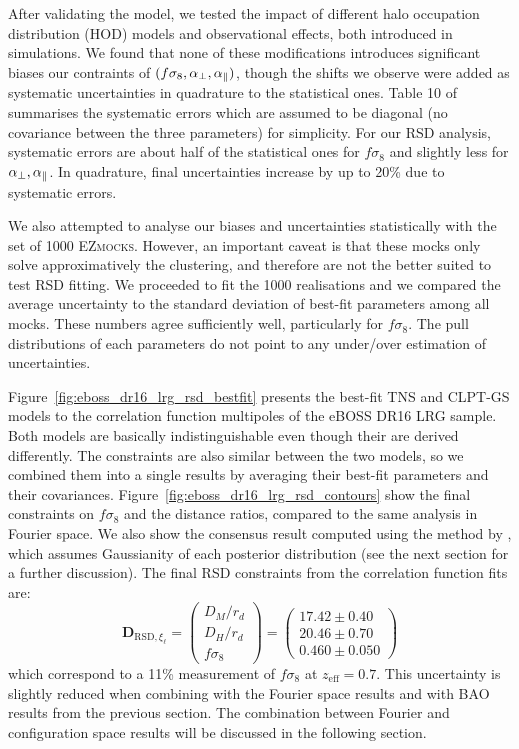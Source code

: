 After validating the model, we tested the impact of different halo occupation distribution (HOD) models 
and observational effects, both introduced in simulations. We found that none of these modifications 
introduces significant biases our contraints of $(f\sigma_8, {\alpha_\perp}, {\alpha_\parallel})$, though the shifts we observe 
were added as systematic uncertainties in quadrature to the statistical ones. 
Table 10 of \cite{bautistaCompletedSDSSIVExtended2020} summarises the systematic errors which are assumed to be
diagonal (no covariance between the three parameters) for simplicity. For our RSD analysis, 
systematic errors are about half of the statistical ones for $f\sigma_8$ and slightly less for ${\alpha_\perp}, {\alpha_\parallel}$. 
In quadrature, final uncertainties increase by up to 20\% due to systematic errors. 

We also attempted to analyse our biases and uncertainties statistically with the set of 1000 \textsc{EZmocks}. 
However, an important caveat is that these mocks only solve approximatively the clustering, and therefore are not 
the better suited to test RSD fitting. We proceeded to fit the 1000 realisations and we compared 
the average uncertainty to the standard deviation of best-fit parameters among all mocks. These numbers 
agree sufficiently well, particularly for $f\sigma_8$. The pull distributions of each parameters do not 
point to any under/over estimation of uncertainties.  

Figure~\ref{fig:eboss_dr16_lrg_rsd_bestfit} presents the best-fit TNS and CLPT-GS models to the correlation function 
multipoles of the eBOSS DR16 LRG sample. 
Both models are basically indistinguishable even though their are derived differently. The constraints are also 
similar between the two models, so we combined them into a single results by averaging their best-fit parameters 
and their covariances. 
Figure~\ref{fig:eboss_dr16_lrg_rsd_contours} show the final constraints on $f\sigma_8$ and the distance ratios, 
compared to the same analysis in Fourier space. We also show the consensus result computed using the method 
by \cite{sanchezClusteringGalaxiesCompleted2017a}, which assumes Gaussianity of each posterior distribution 
(see the next section for a further discussion). 
The final RSD constraints from the correlation function fits are:
\begin{equation}
    \mathbf{D}_{\text{RSD}, {\xi_\ell}} =  
    \begin{pmatrix}
   D_M/r_d \\
   D_H/r_d \\
   f\sigma_8 
    \end{pmatrix}=
    \begin{pmatrix}
    17.42 \pm 0.40 \\
    20.46 \pm 0.70 \\
    0.460 \pm 0.050
    \end{pmatrix}
\end{equation}
which correspond to a 11\% measurement of $f\sigma_8$ at $z_\text{eff} = 0.7$. 
This uncertainty is slightly reduced when combining with the Fourier space results 
and with BAO results from the previous section. 
The combination between Fourier and configuration space results
will be discussed in the following section. 

